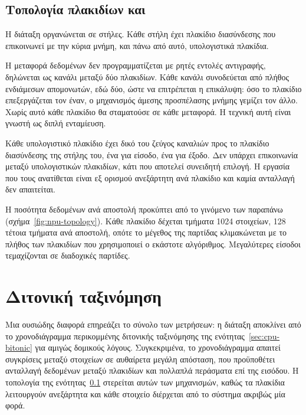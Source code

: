 \subsection{Τοπολογία πλακιδίων και }
\label{sec:npu-objectfifo}

Η διάταξη οργανώνεται σε στήλες. Κάθε στήλη έχει πλακίδιο διασύνδεσης που
επικοινωνεί με την κύρια μνήμη, και πάνω από αυτό, υπολογιστικά πλακίδια.

Η μεταφορά δεδομένων δεν προγραμματίζεται με ρητές εντολές αντιγραφής,
δηλώνεται ως κανάλι μεταξύ δύο πλακιδίων. Κάθε κανάλι συνοδεύεται από πλήθος
ενδιάμεσων απομονωτών, εδώ δύο, ώστε να επιτρέπεται η επικάλυψη: όσο το
πλακίδιο επεξεργάζεται τον έναν, ο μηχανισμός άμεσης προσπέλασης μνήμης γεμίζει
τον άλλο. Χωρίς αυτό κάθε πλακίδιο θα σταματούσε σε κάθε μεταφορά. Η τεχνική
αυτή είναι γνωστή ως διπλή ενταμίευση.

Κάθε υπολογιστικό πλακίδιο έχει δικό του ζεύγος καναλιών προς το πλακίδιο
διασύνδεσης της στήλης του, ένα για είσοδο, ένα για έξοδο. Δεν υπάρχει
επικοινωνία μεταξύ υπολογιστικών πλακιδίων, κάτι που αποτελεί συνειδητή
επιλογή. Η εργασία που τους ανατίθεται είναι εξ ορισμού ανεξάρτητη ανά πλακίδιο
και καμία ανταλλαγή δεν απαιτείται.

Η ποσότητα δεδομένων ανά αποστολή προκύπτει από το γινόμενο των παραπάνω
(σχήμα~\ref{fig:npu-topology}). Κάθε πλακίδιο δέχεται τμήματα 1024 στοιχείων,
128 τέτοια τμήματα ανά αποστολή, οπότε το μέγεθος της παρτίδας κλιμακώνεται με
το πλήθος των πλακιδίων που χρησιμοποιεί ο εκάστοτε αλγόριθμος. Μεγαλύτερες
είσοδοι τεμαχίζονται σε διαδοχικές παρτίδες.



\section{Διτονική ταξινόμηση}
\label{sec:npu-bitonic}

Μια ουσιώδης διαφορά επηρεάζει το σύνολο των μετρήσεων: η διάταξη αποκλίνει από
το χρονοδιάγραμμα περικομμένης διτονικής ταξινόμησης της
ενότητας~\ref{sec:cpu-bitonic} για αμιγώς δομικούς λόγους. Συγκεκριμένα, το
χρονοδιάγραμμα απαιτεί συγκρίσεις μεταξύ στοιχείων σε αυθαίρετα μεγάλη
απόσταση, που προϋποθέτει ανταλλαγή δεδομένων μεταξύ πλακιδίων και πολλαπλά
περάσματα επί της εισόδου. Η τοπολογία της ενότητας~\ref{sec:npu-objectfifo}
στερείται αυτών των μηχανισμών, καθώς τα πλακίδια λειτουργούν ανεξάρτητα και
κάθε στοιχείο διέρχεται από το σύστημα ακριβώς μία φορά.

